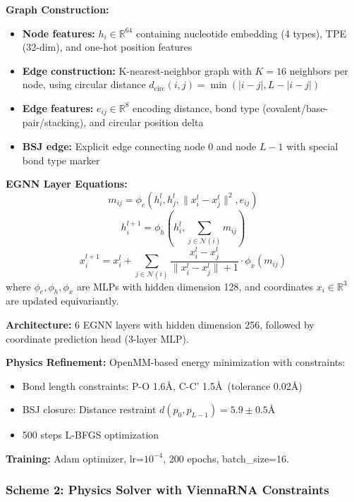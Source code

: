 \documentclass[12pt]{article}
\begin{document}
\textbf{Graph Construction:}
\begin{itemize}
\item \textbf{Node features:} $h_i \in \mathbb{R}^{64}$ containing nucleotide embedding (4 types), TPE (32-dim), and one-hot position features
\item \textbf{Edge construction:} K-nearest-neighbor graph with $K=16$ neighbors per node, using circular distance $d_{\text{circ}}(i,j) = \min(|i-j|, L-|i-j|)$
\item \textbf{Edge features:} $e_{ij} \in \mathbb{R}^{8}$ encoding distance, bond type (covalent/base-pair/stacking), and circular position delta
\item \textbf{BSJ edge:} Explicit edge connecting node 0 and node $L-1$ with special bond type marker
\end{itemize}

\textbf{EGNN Layer Equations:}
\begin{equation}
m_{ij} = \phi_e(h_i^l, h_j^l, \|x_i^l - x_j^l\|^2, e_{ij})
\end{equation}
\begin{equation}
h_i^{l+1} = \phi_h(h_i^l, \sum_{j \in \mathcal{N}(i)} m_{ij})
\end{equation}
\begin{equation}
x_i^{l+1} = x_i^l + \sum_{j \in \mathcal{N}(i)} \frac{x_i^l - x_j^l}{\|x_i^l - x_j^l\| + 1} \cdot \phi_x(m_{ij})
\end{equation}
where $\phi_e, \phi_h, \phi_x$ are MLPs with hidden dimension 128, and coordinates $x_i \in \mathbb{R}^3$ are updated equivariantly.

\textbf{Architecture:} 6 EGNN layers with hidden dimension 256, followed by coordinate prediction head (3-layer MLP).

\textbf{Physics Refinement:} OpenMM-based energy minimization with constraints:
\begin{itemize}
\item Bond length constraints: P-O 1.6\AA, C-C' 1.5\AA\ (tolerance 0.02\AA)
\item BSJ closure: Distance restraint $d(p_0, p_{L-1}) = 5.9 \pm 0.5$\AA
\item 500 steps L-BFGS optimization
\end{itemize}

\textbf{Training:} Adam optimizer, lr=$10^{-4}$, 200 epochs, batch\_size=16.

\subsubsection{Scheme 2: Physics Solver with ViennaRNA Constraints}
\end{document}
